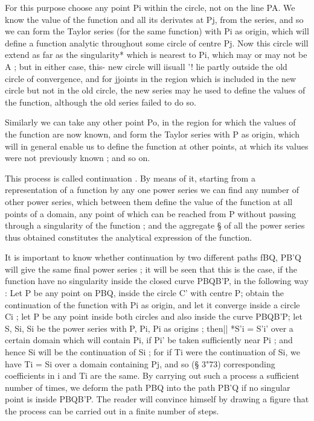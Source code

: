 {{For this purpose choose any point Pi within the circle, not on the
line PA. We know the value of the function and all its derivates at
Pj, from the series, and so we can form the Taylor series (for the
same function) with Pi as origin, which will define a function
analytic throughout some circle of centre Pj. Now this circle will
extend as far as the singularity* which is nearest to Pi, which may or
may not be A ; but in either case, this- new circle will iisuall '!
lie partly outside the old circle of convergence, and for jjoints in
the region which is included in the new circle but not in the old
circle, the new series may he used to define the values of the
function, although the old series failed to do so.

Similarly we can take any other point Po, in the region for which the
values of the function are now known, and form the Taylor series with
P as origin, which will in general enable us to define the function at
other points, at which its values were not previously known ; and so
on.

This process is called continuation . By means of it, starting from a
representation of a function by any one power series we can find any
number of other power series, which between them define the value of
the function at all points of a domain, any point of which can be
reached from P without passing through a singularity of the function ;
and the aggregate § of all the power series thus obtained constitutes
the analytical expression of the function.

It is important to know whether continuation by two different paths
fBQ, PB'Q will give the same final power series ; it will be seen that
this is the case, if the function have no singularity inside the
closed curve PBQB'P, in the following way : Let P be any point on PBQ,
inside the circle C' with centre P; obtain the continuation of the
function with Pi as origin, and let it converge inside a circle Ci ;
let P be any point inside both circles and also inside the curve
PBQB'P; let S, Si, Si be the power series with P, Pi, Pi as origins ;
then|| *S'i = S'i' over a certain domain which will contain Pi, if Pi'
be taken sufficiently near Pi ; and hence Si will be the continuation
of Si ; for if Ti were the continuation of Si, we have Ti = Si over a
domain containing Pj, and so (§ 3"73) corresponding coefficients in i
and Ti are the same. By carrying out such a process a sufficient
number of times, we deform the path PBQ into the path PB'Q if no
singular point is inside PBQB'P. The reader will convince himself by
drawing a figure that the process can be carried out in a finite
number of steps.

}}

